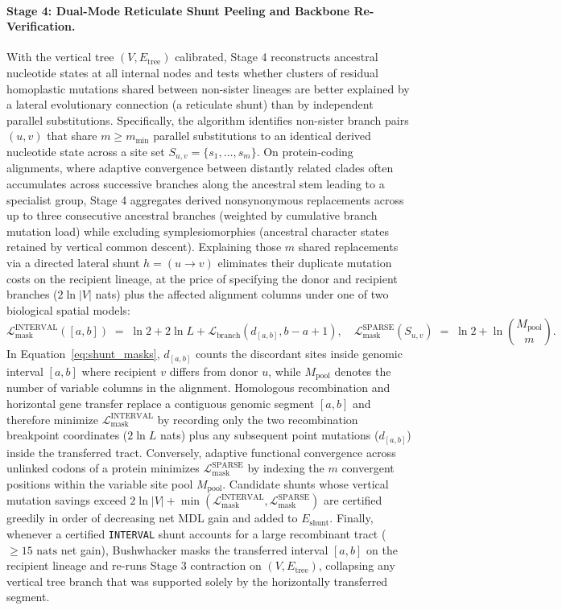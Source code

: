 \documentclass[11pt,a4paper]{article}
\begin{document}
\paragraph{Stage 4: Dual-Mode Reticulate Shunt Peeling and Backbone Re-Verification.}
With the vertical tree $(V, E_{\text{tree}})$ calibrated, Stage 4 reconstructs ancestral nucleotide states at all internal nodes and tests whether clusters of residual homoplastic mutations shared between non-sister lineages are better explained by a lateral evolutionary connection (a reticulate shunt) than by independent parallel substitutions. Specifically, the algorithm identifies non-sister branch pairs $(u,v)$ that share $m \ge m_{\min}$ parallel substitutions to an identical derived nucleotide state across a site set $S_{u,v} = \{s_1, \dots, s_m\}$. On protein-coding alignments, where adaptive convergence between distantly related clades often accumulates across successive branches along the ancestral stem leading to a specialist group, Stage 4 aggregates derived nonsynonymous replacements across up to three consecutive ancestral branches (weighted by cumulative branch mutation load) while excluding symplesiomorphies (ancestral character states retained by vertical common descent). Explaining those $m$ shared replacements via a directed lateral shunt $h = (u \to v)$ eliminates their duplicate mutation costs on the recipient lineage, at the price of specifying the donor and recipient branches ($2\ln|V|$ nats) plus the affected alignment columns under one of two biological spatial models:
\begin{equation}
    \mathcal{L}_{\text{mask}}^{\text{INTERVAL}}([a,b]) \;=\; \ln 2 + 2\ln L + \mathcal{L}_{\text{branch}}(d_{[a,b]}, b - a + 1), \quad
    \mathcal{L}_{\text{mask}}^{\text{SPARSE}}(S_{u,v}) \;=\; \ln 2 + \ln\binom{M_{\text{pool}}}{m}.
    \label{eq:shunt_masks}
\end{equation}
In Equation~\eqref{eq:shunt_masks}, $d_{[a,b]}$ counts the discordant sites inside genomic interval $[a,b]$ where recipient $v$ differs from donor $u$, while $M_{\text{pool}}$ denotes the number of variable columns in the alignment. Homologous recombination and horizontal gene transfer replace a contiguous genomic segment $[a,b]$ and therefore minimize $\mathcal{L}_{\text{mask}}^{\text{INTERVAL}}$ by recording only the two recombination breakpoint coordinates ($2\ln L$ nats) plus any subsequent point mutations ($d_{[a,b]}$) inside the transferred tract. Conversely, adaptive functional convergence across unlinked codons of a protein minimizes $\mathcal{L}_{\text{mask}}^{\text{SPARSE}}$ by indexing the $m$ convergent positions within the variable site pool $M_{\text{pool}}$. Candidate shunts whose vertical mutation savings exceed $2\ln|V| + \min(\mathcal{L}_{\text{mask}}^{\text{INTERVAL}}, \mathcal{L}_{\text{mask}}^{\text{SPARSE}})$ are certified greedily in order of decreasing net MDL gain and added to $E_{\text{shunt}}$. Finally, whenever a certified \texttt{INTERVAL} shunt accounts for a large recombinant tract ($\ge 15\text{ nats}$ net gain), Bushwhacker masks the transferred interval $[a,b]$ on the recipient lineage and re-runs Stage 3 contraction on $(V, E_{\text{tree}})$, collapsing any vertical tree branch that was supported solely by the horizontally transferred segment.
\end{document}
